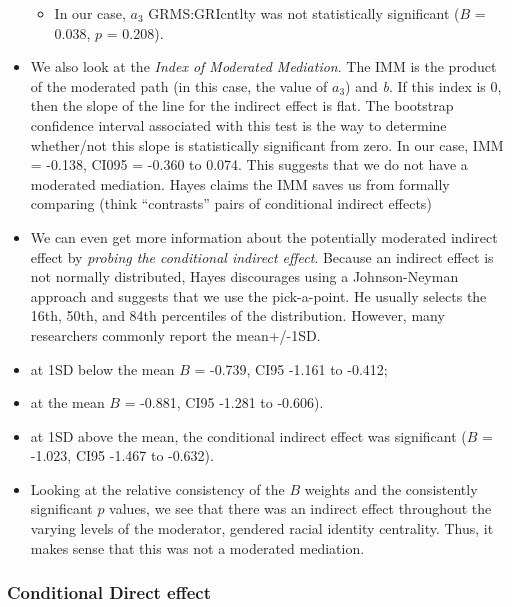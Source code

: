 \documentclass[
  11pt,
]{book}
\providecommand{\tightlist}{%
  \setlength{\itemsep}{0pt}\setlength{\parskip}{0pt}}
\begin{document}
\begin{itemize}
  \begin{itemize}
  \tightlist
  \item
    In our case, \(a_{3}\) GRMS:GRIcntlty was not statistically significant (\(B\) = 0.038, \(p\) = 0.208).
  \end{itemize}
\item
  We also look at the \emph{Index of Moderated Mediation}. The IMM is the product of the moderated path (in this case, the value of \(a_{3}\)) and \emph{b}. If this index is 0, then the slope of the line for the indirect effect is flat. The bootstrap confidence interval associated with this test is the way to determine whether/not this slope is statistically significant from zero. In our case, IMM = -0.138, CI095 = -0.360 to 0.074. This suggests that we do not have a moderated mediation. Hayes claims the IMM saves us from formally comparing (think ``contrasts'' pairs of conditional indirect effects)
\item
  We can even get more information about the potentially moderated indirect effect by \emph{probing the conditional indirect effect}. Because an indirect effect is not normally distributed, Hayes discourages using a Johnson-Neyman approach and suggests that we use the pick-a-point. He usually selects the 16th, 50th, and 84th percentiles of the distribution. However, many researchers commonly report the mean+/-1SD.
\item
  at 1SD below the mean \(B\) = -0.739, CI95 -1.161 to -0.412;
\item
  at the mean \(B\) = -0.881, CI95 -1.281 to -0.606).\\
\item
  at 1SD above the mean, the conditional indirect effect was significant (\(B\) = -1.023, CI95 -1.467 to -0.632).\\
\item
  Looking at the relative consistency of the \(B\) weights and the consistently significant \(p\) values, we see that there was an indirect effect throughout the varying levels of the moderator, gendered racial identity centrality. Thus, it makes sense that this was not a moderated mediation.
\end{itemize}

\hypertarget{conditional-direct-effect}{%
\subsubsection{Conditional Direct effect}\label{conditional-direct-effect}}
\end{document}
